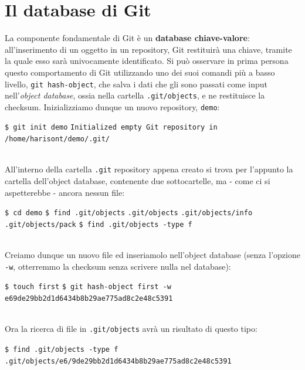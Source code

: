 \documentclass[12pt]{article}
\def\code#1{\texttt{#1}}
\begin{document}
\section{Il database di Git} %
La componente fondamentale di Git è un \textbf{database chiave-valore}: all'inserimento di un oggetto in un repository, Git restituirà una chiave, tramite la quale esso sarà univocamente identificato. 
Si può osservare in prima persona questo comportamento di Git utilizzando uno dei suoi comandi più a basso livello, \code{git hash-object}, che salva i dati che gli sono passati come input nell'\textit{object database}, ossia nella cartella \code{.git/objects}, e ne restituisce la checksum.
Inizializziamo dunque un nuovo repository, \code{demo}:
\begin{algorithm*}
	\begin{algorithmic}
		\State \code{\$ git init demo}
		\State \code{Initialized empty Git repository in /home/harisont/demo/.git/}	
	\end{algorithmic}
\end{algorithm*}
\\All'interno della cartella \code{.git} repository appena creato si trova per l'appunto la cartella dell'object database, contenente due sottocartelle, ma - come ci si aspetterebbe - ancora nessun file:
\begin{algorithm*}
	\begin{algorithmic}
		\State \code{\$ cd demo}
		\State \code{\$ find .git/objects}	
		\State \code{.git/objects}	
		\State \code{.git/objects/info}
		\State \code{.git/objects/pack}
		\State \code{\$ find .git/objects -type f}
		\State \code{ \ }
	\end{algorithmic}
\end{algorithm*}
\\Creiamo dunque un nuovo file ed inseriamolo nell'object database (senza l'opzione \code{-w}, otterremmo la checksum senza scrivere nulla nel database):
\begin{algorithm*}
	\begin{algorithmic}
		\State \code{\$ touch first}
		\State \code{\$ git hash-object first -w}	
		\State \code{e69de29bb2d1d6434b8b29ae775ad8c2e48c5391}	
	\end{algorithmic}
\end{algorithm*}
\\Ora la ricerca di file in \code{.git/objects} avrà un risultato di questo tipo:
\begin{algorithm*}
	\begin{algorithmic}
		\State \code{\$ find .git/objects -type f}
		\State \code{.git/objects/e6/9de29bb2d1d6434b8b29ae775ad8c2e48c5391}	
	\end{algorithmic}
\end{algorithm*}
\end{document}
